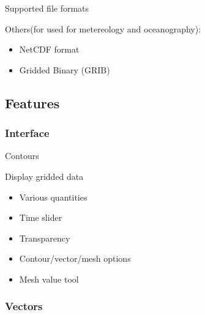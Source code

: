 \begin{frame}{Supported file formats}
	\begin{block}{Others(for used for metereology and oceanography):}
		\begin{itemize}
			\item NetCDF format
			\item Gridded Binary (GRIB)
		\end{itemize}
		
	\end{block}


\end{frame}

\subsection{Features}

\subsubsection{Interface}
\begin{frame}{Contours}
	\begin{block}{Display gridded data}
		\begin{itemize}
			\item Various quantities
			\item Time slider
			\item Transparency
			\item Contour/vector/mesh options
			\item Mesh value tool
			
		\end{itemize}
		
	\end{block}
	
	
\end{frame}

\subsubsection{Vectors}


